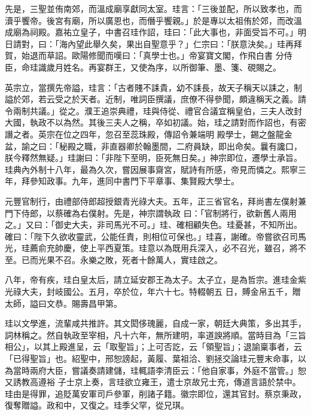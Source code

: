 \begin{pinyinscope}
 先是，三聖並侑南郊，而溫成廟享獻同太室。珪言：「三後並配，所以致孝也，而瀆乎饗帝。後宮有廟，所以廣恩也，而僭乎饗親。」於是專以太祖侑於郊，而改溫成廟為祠殿。嘉祐立皇子，中書召珪作詔，珪曰：「此大事也，非面受旨不可。」明日請對，曰：「海內望此舉久矣，果出自聖意乎？」仁宗曰：「朕意決矣。」珪再拜賀，始退而草詔。歐陽修聞而嘆曰：「真學士也。」帝宴寶文閣，作飛白書
 分侍臣，命珪識歲月姓名。再宴群王，又使為序，以所御筆、墨、箋、硯賜之。



 英宗立，當撰先帝謚，珪言：「古者賤不誄貴，幼不誄長，故天子稱天以誄之，制謚於郊，若云受之於天者。近制，唯詞臣撰議，庶僚不得參聞，頗違稱天之義。請令兩制共議。」從之。濮王追崇典禮，珪與侍從、禮官合議宜稱皇伯，三夫人改封大國，執政不以為然。其後三夫人之稱，卒如初議。始，珪之請對而作詔也，有密譖之者。英宗在位之四年，忽召至蕊珠殿，傳詔令兼端明
 殿學士，錫之盤龍金盆，諭之曰：「秘殿之職，非直器卿於翰墨間，二府員缺，即出命矣。曩有讒口，朕今釋然無疑。」珪謝曰：「非陛下至明，臣死無日矣。」神宗即位，遷學士承旨。珪典內外制十八年，最為久次，嘗因展事齋宮，賦詩有所感，帝見而憐之。熙寧三年，拜參知政事。九年，進同中書門下平章事、集賢殿大學士。



 元豐官制行，由禮部侍郎超授銀青光祿大夫。五年，正三省官名，拜尚書左僕射兼門下侍郎，以蔡確為右僕射。先是，神宗謂執政
 曰：「官制將行，欲新舊人兩用之。」又曰：「御史大夫，非司馬光不可。」珪、確相顧失色。珪憂甚，不知所出。確曰：「陛下久欲收靈武，公能任責，則相位可保也。」珪喜，謝確。帝嘗欲召司馬光，珪薦俞充帥慶，使上平西夏策。珪意以為既用兵深入，必不召光，雖召，將不至。已而光果不召。永樂之敗，死者十餘萬人，實珪啟之。



 八年，帝有疾，珪白皇太后，請立延安郡王為太子。太子立，是為哲宗。進珪金紫光祿大夫，封岐國公。五月，卒於位，年六十七。特輟朝五
 日，賻金帛五千，贈太師，謚曰文恭。賜壽昌甲第。



 珪以文學進，流輩咸共推許。其文閎侈瑰麗，自成一家，朝廷大典策，多出其手，詞林稱之。然自執政至宰相，凡十六年，無所建明，率道諛將順。當時目為「三旨相公」，以其上殿進呈，云「取聖旨」；上可否訖，云「領聖旨」；退諭稟事者，云「已得聖旨」也。紹聖中，邢恕謗起，黃履、葉祖洽、劉拯交論珪元豐末命事，以為當時兩府大臣，嘗議奏請建儲，珪輒語李清臣云：「他自家事，外庭不當管。」恕又誘教高遵裕
 子士京上奏，言珪欲立雍王，遣士京故兄士充，傳道言語於禁中。珪由是得罪，追貶萬安軍司戶參軍，削諸子籍。徽宗即位，還其官封。蔡京秉政，復奪贈謚。政和中，又復之。珪季父罕，從兄琪。




\end{pinyinscope}
